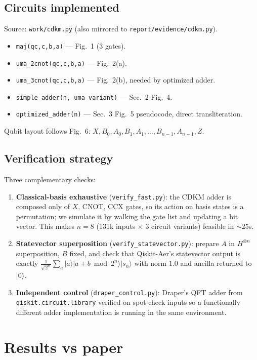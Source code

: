 \documentclass[11pt]{article}
\begin{document}
\subsection{Circuits implemented}
Source: \texttt{work/cdkm.py} (also mirrored to
\texttt{report/evidence/cdkm.py}).
\begin{itemize}
    \item \texttt{maj(qc,c,b,a)} — Fig.~1 (3 gates).
    \item \texttt{uma\_2cnot(qc,c,b,a)} — Fig.~2(a).
    \item \texttt{uma\_3cnot(qc,c,b,a)} — Fig.~2(b), needed by optimized adder.
    \item \texttt{simple\_adder(n, uma\_variant)} — Sec.~2 Fig.~4.
    \item \texttt{optimized\_adder(n)} — Sec.~3 Fig.~5 pseudocode, direct transliteration.
\end{itemize}
Qubit layout follows Fig.~6: $X, B_0, A_0, B_1, A_1, \ldots, B_{n-1}, A_{n-1}, Z$.

\subsection{Verification strategy}
Three complementary checks:
\begin{enumerate}
    \item \textbf{Classical-basis exhaustive} (\texttt{verify\_fast.py}): the
      CDKM adder is composed only of $X$, CNOT, CCX gates, so its action on
      basis states is a permutation; we simulate it by walking the gate list
      and updating a bit vector. This makes $n=8$ (131k inputs $\times$ 3
      circuit variants) feasible in $\sim 25$s.
    \item \textbf{Statevector superposition}
      (\texttt{verify\_statevector.py}): prepare $A$ in $H^{\otimes n}$
      superposition, $B$ fixed, and check that Qiskit-Aer's statevector output
      is exactly $\frac{1}{\sqrt{2^n}}\sum_a \lvert a\rangle\lvert a+b \bmod 2^n\rangle\lvert s_n\rangle$ with
      norm $1.0$ and ancilla returned to $\lvert 0\rangle$.
    \item \textbf{Independent control} (\texttt{draper\_control.py}):
      Draper's QFT adder from \texttt{qiskit.circuit.library} verified on
      spot-check inputs so a functionally different adder implementation is
      running in the same environment.
\end{enumerate}

\section{Results vs paper}
\end{document}
